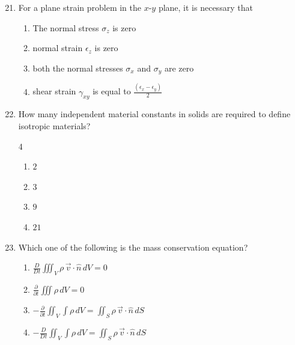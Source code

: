 \documentclass[journal]{IEEEtran}
\theoremstyle{remark}
\begin{document}
\begin{enumerate}[itemsep=1em]
\setcounter{enumi}{20}
\item For a plane strain problem in the $x$-$y$ plane, it is necessary that 
\begin{enumerate}[label=\Alph*), leftmargin=2.5em, labelsep=0.5em, itemsep=0.5em]
      \item The normal stress $\sigma_z$ is zero
      \item normal strain $\epsilon_z$ is zero
      \item both the normal stresses $\sigma_x$ and $\sigma_y$ are zero
      \item shear strain $\gamma_{xy}$ is equal to $\frac{(\epsilon_x-\epsilon_y)}{2}$

\end{enumerate}
\end{enumerate}

\begin{enumerate}[itemsep=1em]
\setcounter{enumi}{21}
\item How many independent material constants in solids are required to define isotropic materials? 
\begin{multicols}{4}
\begin{enumerate}[label=\Alph*)]
      \item $2$
      \item $3$
      \item $9$  
      \item $21$
\end{enumerate}
\end{multicols}
\end{enumerate}

\begin{enumerate}[itemsep=1em]
\setcounter{enumi}{22}
\item Which one of the following is the mass conservation equation?
\begin{enumerate}[label=\Alph*), leftmargin=2.5em, labelsep=0.5em, itemsep=0.5em]
    \item $\frac{D}{Dt} \iiint_{V} \rho \, \overrightarrow{v} \cdot \hat{n} \, dV = 0$
    \item $\frac{\partial}{\partial t} \iiint \rho \, dV = 0 $
    \item $-\frac{\partial}{\partial t} \iint_{V} \!\!\int \rho \, dV 
        = \iint_{S} \rho \, \vec{v} \cdot \hat{n} \, dS $ 
    \item  $-\frac{D}{Dt} \iint_{V} \!\!\int \rho \, dV 
  = \iint_{S} \rho \, \vec{v} \cdot \hat{n} \, dS $ 
  
      
\end{enumerate}
\end{enumerate}
\end{document}
